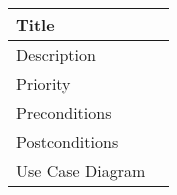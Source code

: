 \subsubsection{}
  \begin{table}[h!]
    \caption{}
    \label{evolutionary-requirements/non-functional-requirements}
    \begin{tabularx}{\textwidth}{|l|X|}
      \hline
      Title            &  \\ \hline
      Description      &  \\ \hline
      Priority         &  \\ \hline
      Preconditions    &  \\ \hline
      Postconditions   & \\ \hline
      Use Case Diagram & \\ \hline
    \end{tabularx}
  \end{table}
